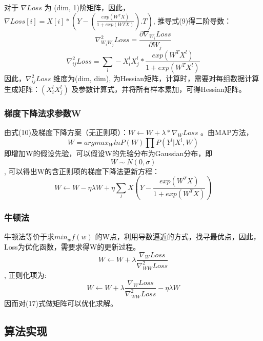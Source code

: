 \documentclass{article}
\begin{document}
对于 $\nabla Loss$ 为 (dim, 1)阶矩阵，因此，$\nabla Loss[i] = X[i]*(Y-(\frac{exp(W^TX)}{1+exp(WTX)}).T)$, 推导式(9)得二阶导数：
\begin{equation}
    \nabla_{W_iW_j}^2 Loss = \frac{\partial \nabla_{W_i} Loss}{\partial W_j}
\end{equation}
\begin{equation}
    \nabla_{ij}^2 Loss = \sum_l -X_i^lX_j^l*\frac{exp(W^TX^l)}{1+exp(W^TX^l)}
\end{equation}
因此，$\nabla_{ij}^2Loss$ 维度为(dim, dim), 为Hessian矩阵，计算时，需要对每组数据计算生成矩阵：$(X_i^lX_j^l)$ 及参数计算式，并将所有样本累加，可得Hessian矩阵。

\subsubsection{梯度下降法求参数W}
由式(10)及梯度下降方案（无正则项）：$W \leftarrow W+\lambda*\nabla_W Loss$ 。由MAP方法，\begin{equation} W = argmax_W ln P(W)\prod P(Y^l|X^l, W) \end{equation} 即增加W的假设先验，可以假设W的先验分布为Gaussian分布，即\begin{equation} W \sim N(0, \sigma) \end{equation}, 可以得出W的含正则项的梯度下降法更新方程：\begin{equation} W \leftarrow W - \eta\lambda W + \eta\sum_lX(Y-\frac{exp(W^TX)}{1+exp(W^TX)}) \end{equation}

\subsubsection{牛顿法}
牛顿法等价于求$min_w f(w)$ 的W点，利用导数逼近的方式，找寻最优点，因此，Loss为优化函数，需要求得W的更新过程。
\begin{equation} W \leftarrow W + \lambda\frac{\nabla_W Loss}{\nabla_{WW}^2 Loss} \end{equation}, 正则化项为:\begin{equation} W \leftarrow W + \lambda\frac{\nabla_W Loss}{\nabla_{WW}^2 Loss} - \eta\lambda W \end{equation}因而对(17)式做矩阵可以优化求解。

\subsection{算法实现}
\end{document}

